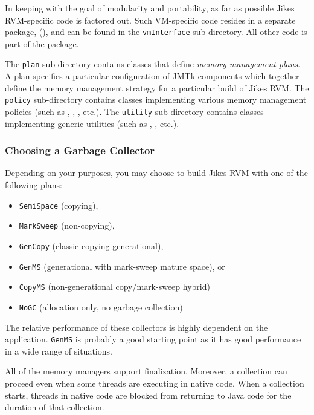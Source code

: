 In keeping with the goal of modularity and portability, as far as
possible Jikes RVM-specific code is factored out.  Such VM-specific
code resides in a separate package,
(),
and can be found in the \texttt{vmInterface} sub-directory.  All other
code is part of the
package.

The \texttt{plan} sub-directory contains classes that define
\emph{memory management plans}.  A plan specifies a particular
configuration of JMTk components which together define the memory
management strategy for a particular build of Jikes RVM.  The
\texttt{policy} sub-directory contains classes implementing various
memory management policies (such as , , , etc.).  The \texttt{utility}
sub-directory contains classes implementing generic utilities (such as
,
, etc.).

\subsubsection{Choosing a Garbage Collector} \label{ssec:choosinggc}

Depending on your purposes, you may choose to build Jikes RVM with one
of the following plans:
\begin{itemize}
\item \texttt{SemiSpace} (copying),
\item \texttt{MarkSweep} (non-copying),
\item \texttt{GenCopy} (classic copying generational),
\item \texttt{GenMS} (generational with mark-sweep mature space), or
\item \texttt{CopyMS} (non-generational copy/mark-sweep hybrid)
\item \texttt{NoGC} (allocation only, no garbage collection)
\end{itemize}
The relative performance of these collectors is highly dependent on
the application.  \texttt{GenMS} is probably a good starting point as
it has good performance in a wide range of situations.

All of the memory managers support finalization.  Moreover, a
collection can proceed even when some threads are executing in native
code. When a collection starts, threads in native code are blocked
from returning to Java code for the duration of that collection.

